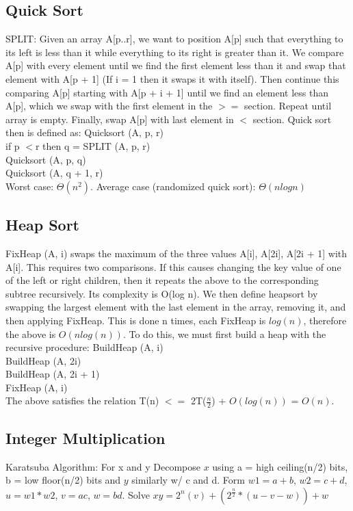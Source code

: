 \documentclass{article}
\begin{document}
\subsection*{Quick Sort}
SPLIT: Given an array A[p..r], we want to position A[p] such that everything to its left is less than it while everything to its right is greater than it. We compare A[p] with every element until we find the first element less than it and swap that element with A[p + 1] (If i = 1 then it  swaps it with itself). Then continue this comparing A[p] starting with A[p + i + 1] until we find an element less than A[p], which we swap with the first element in the $>=$ section. Repeat until array is empty. Finally, swap A[p] with
last element in $<$ section.
Quick sort then is defined as: 
Quicksort (A, p, r) \\
if p $<$r then q = SPLIT (A, p, r) \\
Quicksort (A, p, q) \\
Quicksort (A, q + 1, r) \\
Worst case: $\Theta(n^2)$. Average case (randomized quick sort): $\Theta(nlogn)$
\subsection*{Heap Sort}
FixHeap (A, i) swaps the maximum of the three values A[i], A[2i], A[2i + 1] with A[i]. This requires two comparisons. If this causes changing the key value of one of the left or right children, then it repeats the above to the corresponding subtree recursively. Its complexity is O(log n).
We then define heapsort by swapping the largest element with the last element in the array, removing it,  and then applying FixHeap. This is done n times, each FixHeap is $log(n)$, therefore the above is $O(nlog(n))$. To do this, we must first build a heap with the recursive procedure:
BuildHeap (A, i) \\
BuildHeap (A, 2i) \\
BuildHeap (A, 2i + 1) \\
FixHeap (A, i)\\
The above satisfies the relation T(n) $<=$ 2T($\frac{n}{2}$) + $O(log(n))$ = $O(n)$. 
\subsection*{Integer Multiplication}
Karatsuba Algorithm:
For x and y Decompose $x$ using a = high ceiling(n/2) bits, b = low floor(n/2) bits
and $y$ similarly w/ c and d. Form $w1 = a + b$, $w2 = c + d$, $u = w1*w2$, $v = ac$, $w = bd$. Solve $xy = 2^n(v) + (2^{\frac{n}{2}}* (u-v-w)) + w$
\end{document}

